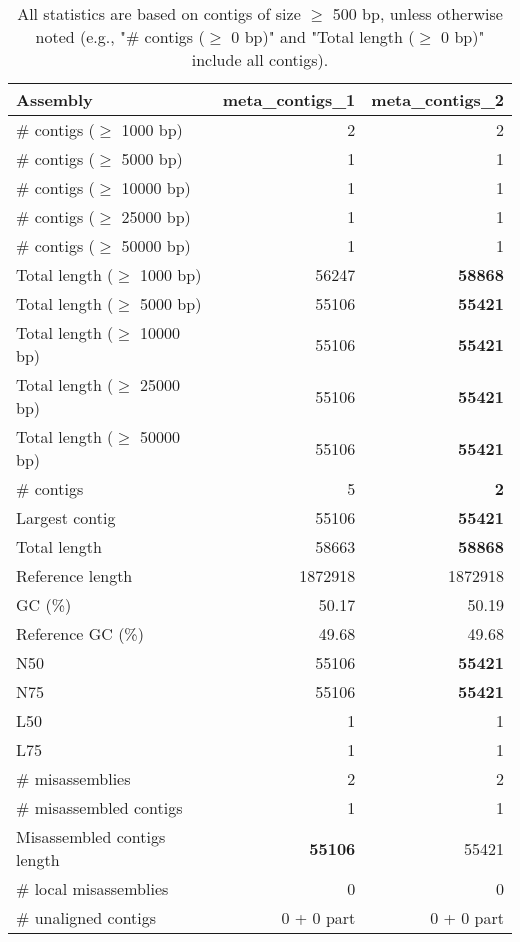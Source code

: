 \documentclass[12pt,a4paper]{article}
\begin{document}
\begin{table}[ht]
\begin{center}
\caption{All statistics are based on contigs of size $\geq$ 500 bp, unless otherwise noted (e.g., "\# contigs ($\geq$ 0 bp)" and "Total length ($\geq$ 0 bp)" include all contigs).}
\begin{tabular}{|l*{2}{|r}|}
\hline
Assembly & meta\_contigs\_1 & meta\_contigs\_2 \\ \hline
\# contigs ($\geq$ 1000 bp) & 2 & 2 \\ \hline
\# contigs ($\geq$ 5000 bp) & 1 & 1 \\ \hline
\# contigs ($\geq$ 10000 bp) & 1 & 1 \\ \hline
\# contigs ($\geq$ 25000 bp) & 1 & 1 \\ \hline
\# contigs ($\geq$ 50000 bp) & 1 & 1 \\ \hline
Total length ($\geq$ 1000 bp) & 56247 & {\bf 58868} \\ \hline
Total length ($\geq$ 5000 bp) & 55106 & {\bf 55421} \\ \hline
Total length ($\geq$ 10000 bp) & 55106 & {\bf 55421} \\ \hline
Total length ($\geq$ 25000 bp) & 55106 & {\bf 55421} \\ \hline
Total length ($\geq$ 50000 bp) & 55106 & {\bf 55421} \\ \hline
\# contigs & 5 & {\bf 2} \\ \hline
Largest contig & 55106 & {\bf 55421} \\ \hline
Total length & 58663 & {\bf 58868} \\ \hline
Reference length & 1872918 & 1872918 \\ \hline
GC (\%) & 50.17 & 50.19 \\ \hline
Reference GC (\%) & 49.68 & 49.68 \\ \hline
N50 & 55106 & {\bf 55421} \\ \hline
N75 & 55106 & {\bf 55421} \\ \hline
L50 & 1 & 1 \\ \hline
L75 & 1 & 1 \\ \hline
\# misassemblies & 2 & 2 \\ \hline
\# misassembled contigs & 1 & 1 \\ \hline
Misassembled contigs length & {\bf 55106} & 55421 \\ \hline
\# local misassemblies & 0 & 0 \\ \hline
\# unaligned contigs & 0 + 0 part & 0 + 0 part \\ \hline

\end{tabular}
\end{center}
\end{table}
\end{document}
